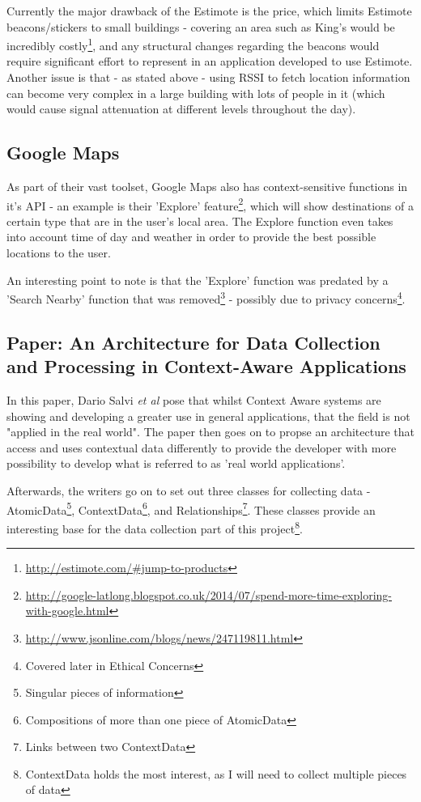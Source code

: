 \documentclass[11pt]{informatics-report}
\begin{document}
Currently the major drawback of the Estimote is the price, which limits Estimote beacons/stickers to small buildings - covering an area such as King's would be incredibly costly\footnote{\url{http://estimote.com/\#jump-to-products}}, and any structural changes regarding the beacons would require significant effort to represent in an application developed to use Estimote. Another issue is that - as stated above - using RSSI to fetch location information can become very complex in a large building with lots of people in it (which would cause signal attenuation at different levels throughout the day). 

\subsection{Google Maps}

As part of their vast toolset, Google Maps also has context-sensitive functions in it's API - an example is their 'Explore' feature\footnote{\url{http://google-latlong.blogspot.co.uk/2014/07/spend-more-time-exploring-with-google.html}}, which will show destinations of a certain type that are in the user's local area. The Explore function even takes into account time of day and weather in order to provide the best possible locations to the user.

An interesting point to note is that the 'Explore' function was predated by a 'Search Nearby' function that was removed\footnote{\url{http://www.jsonline.com/blogs/news/247119811.html}} - possibly due to privacy concerns\footnote{Covered later in Ethical Concerns}.


\subsection{Paper: An Architecture for Data Collection and Processing in Context-Aware Applications\cite{salviarchitecture}}

In this paper, Dario Salvi \textit{et al} pose that whilst Context Aware systems are showing and developing a greater use in general applications, that the field is not "applied in the real world"\cite{salviarchitecture}. The paper then goes on to propse an architecture that access and uses contextual data differently to provide the developer with more possibility to develop what is referred to as 'real world applications'.

Afterwards, the writers go on to set out three classes for collecting data - AtomicData\footnote{Singular pieces of information}, ContextData\footnote{Compositions of more than one piece of AtomicData}, and Relationships\footnote{Links between two ContextData}\cite{salviarchitecture}. These classes provide an interesting base for the data collection part of this project\footnote{ContextData holds the most interest, as I will need to collect multiple pieces of data}.
\end{document}

